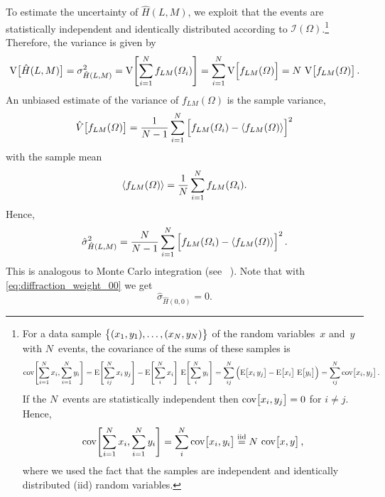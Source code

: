 To estimate the uncertainty of $\hat{H}(L, M)$, we exploit that the
events are statistically independent and identically distributed
according to $\mathcal{I}(\Omega)$.\footnote{%
  For a data sample $\cBrk{(x_1, y_1), \ldots, (x_N, y_N)}$ of the
  random variables~$x$ and~$y$ with $N$~events, the covariance of the
  sums of these samples is
  \begin{equation}
    \cov[4]{\sum_{i = 1}^N x_i, \sum_{i = 1}^N y_i}
    = \exptVal[4]{\sum_{i j}^N x_i\, y_j} - \exptVal[4]{\sum_i^N x_i}\, \exptVal[4]{\sum_i^N y_i}
    = \sum_{i j}^N \rBrk[2]{\exptVal[1]{x_i\, y_j} - \exptVal[1]{x_i}\, \exptVal[1]{y_i}}
    = \sum_{i j}^N \cov[1]{x_i, y_j}.
  \end{equation}
  If the $N$~events are statistically independent then $\cov[1]{x_i,
  y_j} = 0$ for $i \neq j$.  Hence,
  \begin{equation}
    \cov[4]{\sum_{i = 1}^N x_i, \sum_{i = 1}^N y_i}
    = \sum_i^N \cov[1]{x_i, y_i}
    \equalUsing{\text{iid}} N\, \cov[1]{x, y},
  \end{equation}
  where we used the fact that the samples are independent and
  identically distributed (iid) random variables.
}  Therefore, the variance is given by
\begin{equation}
  \label{eq:diffraction_moments_var}
  \var[1]{\hat{H}(L, M)}
  = \sigma_{\hat{H}(L, M)}^2
  = \var[4]{\sum_{i = 1}^N f_{L M}(\Omega_i)}
  = \sum_{i = 1}^N \var[2]{f_{L M}(\Omega)}
  = N\, \var[1]{f_{L M}(\Omega)}.
\end{equation}
An unbiased estimate of the variance of $f_{L M}(\Omega)$ is the
sample variance, \ie
\begin{equation}
  \hat{V}\!\sBrk[1]{f_{L M}(\Omega)}
  = \frac{1}{N - 1} \sum_{i = 1}^N \sBrk[2]{f_{L M}(\Omega_i) - \mean{f_{L M}(\Omega)}}^2
\end{equation}
with the sample mean
\begin{equation}
  \langle{f_{L M}(\Omega)}\rangle
  = \frac{1}{N} \sum_{i = 1}^N f_{L M}(\Omega_i).
\end{equation}
Hence,
\begin{equation}
  \label{eq:diffraction_moments_stdDev}
  \hat{\sigma}_{\hat{H}(L, M)}^2
  = \frac{N}{N - 1} \sum_{i = 1}^N \sBrk[2]{f_{L M}(\Omega_i) - \mean{f_{L M}(\Omega)}}^2.
\end{equation}
This is analogous to Monte Carlo integration (see \eg\
).  Note that with
\cref{eq:diffraction_weight_00} we get
\begin{equation}
  \hat{\sigma}_{\hat{H}(0, 0)}
  = 0.
\end{equation}

